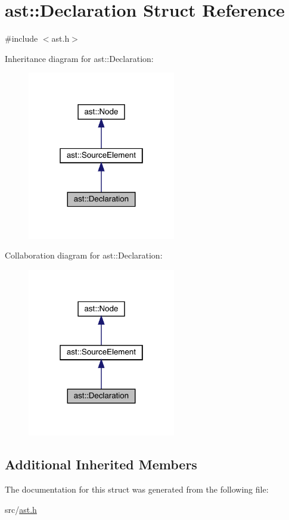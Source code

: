 \hypertarget{structast_1_1_declaration}{}\section{ast\+:\+:Declaration Struct Reference}
\label{structast_1_1_declaration}


{\ttfamily \#include $<$ast.\+h$>$}



Inheritance diagram for ast\+:\+:Declaration\+:\nopagebreak
\begin{figure}[H]
\begin{center}
\leavevmode
\includegraphics[width=183pt]{structast_1_1_declaration__inherit__graph}
\end{center}
\end{figure}


Collaboration diagram for ast\+:\+:Declaration\+:\nopagebreak
\begin{figure}[H]
\begin{center}
\leavevmode
\includegraphics[width=183pt]{structast_1_1_declaration__coll__graph}
\end{center}
\end{figure}
\subsection*{Additional Inherited Members}


The documentation for this struct was generated from the following file\+:\begin{DoxyCompactItemize}
\item 
src/\hyperlink{ast_8h}{ast.\+h}\end{DoxyCompactItemize}
